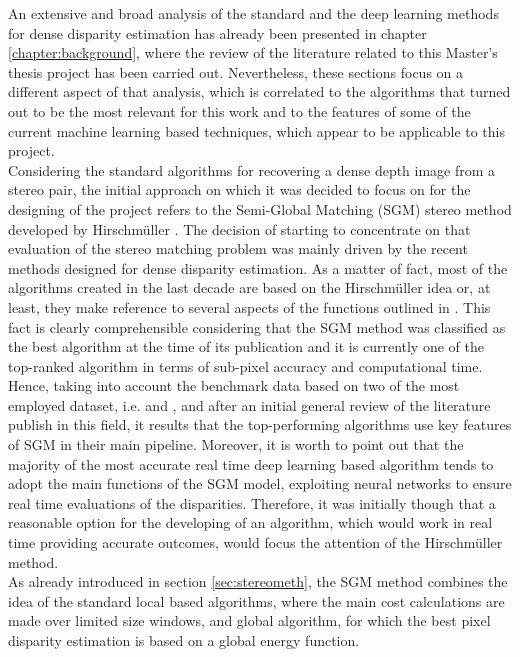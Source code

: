 An extensive and broad analysis of the standard and the deep learning methods for dense disparity estimation has already been presented in chapter \ref{chapter:background}, where the review of the literature related to this Master's thesis project has been carried out.
Nevertheless, these sections focus on a different aspect of that analysis, which is correlated to the algorithms that turned out to be the most relevant for this work and to the features of some of the current machine learning based techniques, which appear to be applicable to this project.\\
Considering the standard algorithms for recovering a dense depth image from a stereo pair, the initial approach on which it was decided to focus on for the designing of the project refers to the Semi-Global Matching (SGM) stereo method developed by Hirschm\"{u}ller \cite{Hirschmuller2008}.
The decision of starting to concentrate on that evaluation of the stereo matching problem was mainly driven by the recent methods designed for dense disparity estimation.
As a matter of fact, most of the algorithms created in the last decade are based on the Hirschm\"{u}ller idea or, at least, they make reference to several aspects of the functions outlined in \cite{Hirschmuller2008}.
This fact is clearly comprehensible considering that the SGM method was classified as the best algorithm at the time of its publication and it is currently one of the top-ranked algorithm in terms of sub-pixel accuracy and computational time.
Hence, taking into account the benchmark data based on two of the most employed dataset, i.e. \cite{Scharstein2014} and \cite{geiger2013vision}, and after an initial general review of the literature publish in this field, it results that the top-performing algorithms use key features of SGM in their main pipeline. 
Moreover, it is worth to point out that the majority of the most accurate real time deep learning based algorithm tends to adopt the main functions of the SGM model, exploiting neural networks to ensure real time evaluations of the disparities.
Therefore, it was initially though that a reasonable option for the developing of an algorithm, which would work in real time providing accurate outcomes, would focus the attention of the Hirschm\"{u}ller method.\\
As already introduced in section \ref{sec:stereometh}, the SGM method combines the idea of the standard local based algorithms, where the main cost calculations are made over limited size windows, and global algorithm, for which the best pixel disparity estimation is based on a global energy function. 
